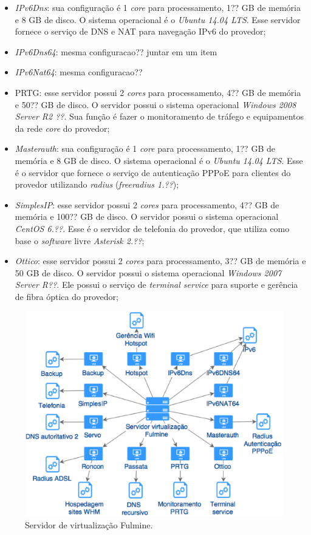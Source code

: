\begin{itemize}
 \item \textit{IPv6Dns}: sua configuração é 1 \textit{core} para processamento, 1?? GB de memória e 8 GB de disco. O sistema operacional é o 
 \textit{Ubuntu 14.04 \ac{LTS}}. Esse servidor fornece o serviço de \ac{DNS} e \ac{NAT} para navegação \ac{IPv6} do provedor;
 \item \textit{IPv6Dns64}: mesma configuracao?? juntar em um item
 \item \textit{IPv6Nat64}: mesma configuracao??
 
 \item \ac{PRTG}: esse servidor possui 2 \textit{cores} para processamento, 4?? GB de memória e 50?? GB de disco. O servidor possui o sistema 
 operacional \textit{Windows 2008 Server R2 ??}. Sua função é fazer o monitoramento de tráfego e equipamentos da rede \textit{core} do provedor;
 
 \item \textit{Masterauth}: sua configuração é 1 \textit{core} para processamento, 1?? GB de memória e 8 GB de disco. O sistema operacional é o 
 \textit{Ubuntu 14.04 \ac{LTS}}. Esse é o servidor que fornece o serviço de autenticação \ac{PPPoE} para clientes do provedor utilizando 
 \textit{radius} (\textit{freeradius 1.??});
 
 \item \textit{SimplesIP}: esse servidor possui 2 \textit{cores} para processamento, 4?? GB de memória e 100?? GB de disco. O servidor possui 
 o sistema operacional \textit{CentOS 6.??}. Esse é o servidor de telefonia do provedor, que utiliza como base o \textit{software} livre 
 \textit{Asterisk 2.??};
 
 \item \textit{Ottico}: esse servidor possui 2 \textit{cores} para processamento, 3?? GB de memória e 50 GB de disco. O servidor possui o sistema 
 operacional \textit{Windows 2007 Server R??}. Ele possui o serviço de \textit{terminal service} para suporte e gerência de fibra óptica do 
 provedor;
\end{itemize}

\begin{figure}[h!]
 \centering
 \includegraphics[width=430px]{img/servlog2.eps}
 \caption{Servidor de virtualização Fulmine.}
 \label{fig:servlog2}
\end{figure}

